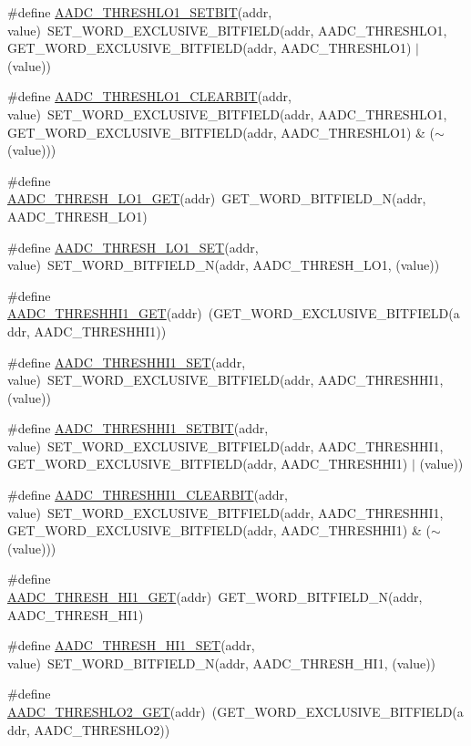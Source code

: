 \begin{DoxyCompactItemize}
\#define \hyperlink{a00542_aa824155ca56b380a4ba0c9ce8cc88f46}{AADC\_\-THRESHLO1\_\-SETBIT}(addr, value)~SET\_\-WORD\_\-EXCLUSIVE\_\-BITFIELD(addr, AADC\_\-THRESHLO1, GET\_\-WORD\_\-EXCLUSIVE\_\-BITFIELD(addr, AADC\_\-THRESHLO1) $|$ (value))
\item 
\#define \hyperlink{a00542_aebfb1cbbc99f600f41063f34ac688d8a}{AADC\_\-THRESHLO1\_\-CLEARBIT}(addr, value)~SET\_\-WORD\_\-EXCLUSIVE\_\-BITFIELD(addr, AADC\_\-THRESHLO1, GET\_\-WORD\_\-EXCLUSIVE\_\-BITFIELD(addr, AADC\_\-THRESHLO1) \& ($\sim$(value)))
\item 
\#define \hyperlink{a00542_a6885a34332ee0b6f31657d3ace88d816}{AADC\_\-THRESH\_\-LO1\_\-GET}(addr)~GET\_\-WORD\_\-BITFIELD\_\-N(addr, AADC\_\-THRESH\_\-LO1)
\item 
\#define \hyperlink{a00542_a3f95b42b259fe3afc999560450cad456}{AADC\_\-THRESH\_\-LO1\_\-SET}(addr, value)~SET\_\-WORD\_\-BITFIELD\_\-N(addr, AADC\_\-THRESH\_\-LO1, (value))
\item 
\#define \hyperlink{a00542_a04b45c5f16597c9fb25f99b15e9053dc}{AADC\_\-THRESHHI1\_\-GET}(addr)~(GET\_\-WORD\_\-EXCLUSIVE\_\-BITFIELD(addr, AADC\_\-THRESHHI1))
\item 
\#define \hyperlink{a00542_a4c8e626ad8d1e78808d289a42ca80339}{AADC\_\-THRESHHI1\_\-SET}(addr, value)~SET\_\-WORD\_\-EXCLUSIVE\_\-BITFIELD(addr, AADC\_\-THRESHHI1, (value))
\item 
\#define \hyperlink{a00542_af06118840a6314ce19fc7649f73cf431}{AADC\_\-THRESHHI1\_\-SETBIT}(addr, value)~SET\_\-WORD\_\-EXCLUSIVE\_\-BITFIELD(addr, AADC\_\-THRESHHI1, GET\_\-WORD\_\-EXCLUSIVE\_\-BITFIELD(addr, AADC\_\-THRESHHI1) $|$ (value))
\item 
\#define \hyperlink{a00542_a2dac076e653417eaa2e16849f64a8d63}{AADC\_\-THRESHHI1\_\-CLEARBIT}(addr, value)~SET\_\-WORD\_\-EXCLUSIVE\_\-BITFIELD(addr, AADC\_\-THRESHHI1, GET\_\-WORD\_\-EXCLUSIVE\_\-BITFIELD(addr, AADC\_\-THRESHHI1) \& ($\sim$(value)))
\item 
\#define \hyperlink{a00542_ac88fdf077877c1faa833006374e85822}{AADC\_\-THRESH\_\-HI1\_\-GET}(addr)~GET\_\-WORD\_\-BITFIELD\_\-N(addr, AADC\_\-THRESH\_\-HI1)
\item 
\#define \hyperlink{a00542_a15b0d8962ffc1dd51937292c9c6792c5}{AADC\_\-THRESH\_\-HI1\_\-SET}(addr, value)~SET\_\-WORD\_\-BITFIELD\_\-N(addr, AADC\_\-THRESH\_\-HI1, (value))
\item 
\#define \hyperlink{a00542_a583ccad0476c6647c6a9b0ab7eaeda41}{AADC\_\-THRESHLO2\_\-GET}(addr)~(GET\_\-WORD\_\-EXCLUSIVE\_\-BITFIELD(addr, AADC\_\-THRESHLO2))
\item 

\end{DoxyCompactItemize}
